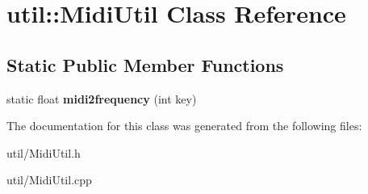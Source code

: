 \hypertarget{classutil_1_1MidiUtil}{}\section{util\+:\+:Midi\+Util Class Reference}
\label{classutil_1_1MidiUtil}
\subsection*{Static Public Member Functions}
\begin{DoxyCompactItemize}
\item 
static float {\bfseries midi2frequency} (int key)\hypertarget{classutil_1_1MidiUtil_a04b46794718bd5d4eeaa58b110bea689}{}\label{classutil_1_1MidiUtil_a04b46794718bd5d4eeaa58b110bea689}

\end{DoxyCompactItemize}


The documentation for this class was generated from the following files\+:\begin{DoxyCompactItemize}
\item 
util/Midi\+Util.\+h\item 
util/Midi\+Util.\+cpp\end{DoxyCompactItemize}
